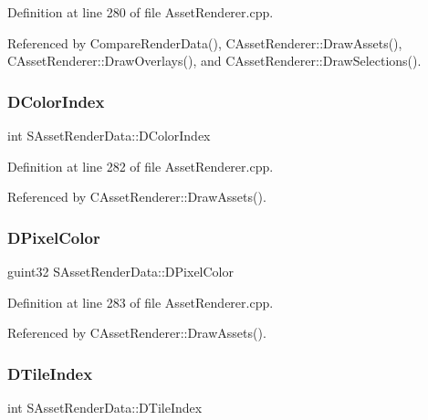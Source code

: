 Definition at line 280 of file Asset\+Renderer.\+cpp.



Referenced by Compare\+Render\+Data(), C\+Asset\+Renderer\+::\+Draw\+Assets(), C\+Asset\+Renderer\+::\+Draw\+Overlays(), and C\+Asset\+Renderer\+::\+Draw\+Selections().

\hypertarget{structSAssetRenderData_a589dca7066d667b74c954b9b16671454}{}\label{structSAssetRenderData_a589dca7066d667b74c954b9b16671454} 
\subsubsection{\texorpdfstring{D\+Color\+Index}{DColorIndex}}
{\footnotesize\ttfamily int S\+Asset\+Render\+Data\+::\+D\+Color\+Index}



Definition at line 282 of file Asset\+Renderer.\+cpp.



Referenced by C\+Asset\+Renderer\+::\+Draw\+Assets().

\hypertarget{structSAssetRenderData_a94ac857717a32afcd7118316df5f8d88}{}\label{structSAssetRenderData_a94ac857717a32afcd7118316df5f8d88} 
\subsubsection{\texorpdfstring{D\+Pixel\+Color}{DPixelColor}}
{\footnotesize\ttfamily guint32 S\+Asset\+Render\+Data\+::\+D\+Pixel\+Color}



Definition at line 283 of file Asset\+Renderer.\+cpp.



Referenced by C\+Asset\+Renderer\+::\+Draw\+Assets().

\hypertarget{structSAssetRenderData_a8c97c7f34d5b359f6fa23ce215a09929}{}\label{structSAssetRenderData_a8c97c7f34d5b359f6fa23ce215a09929} 
\subsubsection{\texorpdfstring{D\+Tile\+Index}{DTileIndex}}
{\footnotesize\ttfamily int S\+Asset\+Render\+Data\+::\+D\+Tile\+Index}



